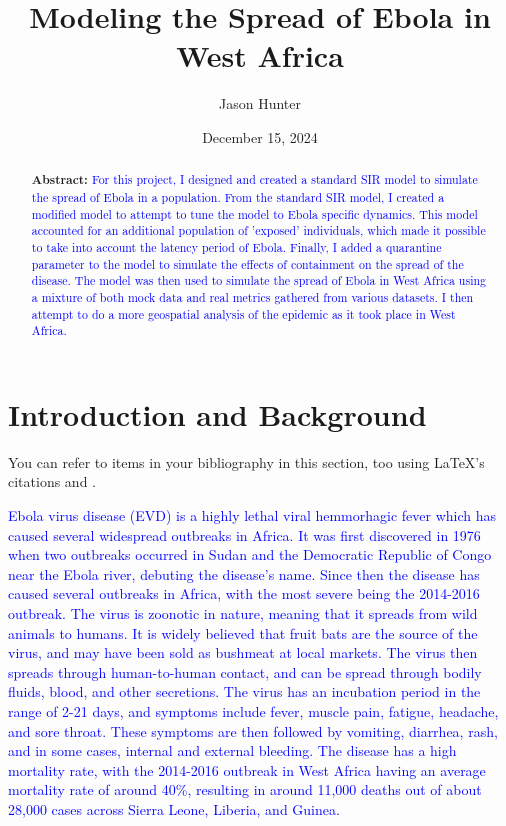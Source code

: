 \documentclass[%
 reprint,
superscriptaddress,
 amsmath,amssymb,
 aps,
]{revtex4-2}
\begin{document}
\title{Modeling the Spread of Ebola in West Africa} %

\author{Jason Hunter}


\date{December 15, 2024}%

\begin{abstract}
{\bf Abstract:} \textcolor{blue}{For this project, I designed and created a standard SIR model to simulate the spread of Ebola in a population. From the standard SIR model, I created a modified model to attempt to tune the model to Ebola specific dynamics. This model accounted for an additional population of 'exposed' individuals, which made it possible to take into account the latency period of Ebola. Finally, I added a quarantine parameter to the model to simulate the effects of containment on the spread of the disease. The model was then used to simulate the spread of Ebola in West Africa using a mixture of both mock data and real metrics gathered from various datasets. I then attempt to do a more geospatial analysis of the epidemic as it took place in West Africa.}
\end{abstract}

\maketitle

\section{Introduction and Background}

You can refer to items in your bibliography in this section, too using LaTeX's citations \cite{aa} and \cite{bb}.

\textcolor{blue}{ Ebola virus disease (EVD) is a highly lethal viral hemmorhagic fever which has caused several widespread outbreaks in Africa. It was first discovered in 1976 when two outbreaks occurred in Sudan and the Democratic Republic of Congo near the Ebola river, debuting the disease's name. Since then the disease has caused several outbreaks in Africa, with the most severe being the 2014-2016 outbreak. 
The virus is zoonotic in nature, meaning that it spreads from wild animals to humans. It is widely believed that fruit bats are the source of the virus, and may have been sold as bushmeat at local markets. The virus then spreads through human-to-human contact, and can be spread through bodily fluids, blood, and other secretions. 
The virus has an incubation period in the range of 2-21 days, and symptoms include fever, muscle pain, fatigue, headache, and sore throat. These symptoms are then followed by vomiting, diarrhea, rash, and in some cases, internal and external bleeding. The disease has a high mortality rate, with the 2014-2016 outbreak in West Africa having an average mortality rate of around 40\%, resulting in around 11,000 deaths out of about 28,000 cases across Sierra Leone, Liberia, and Guinea.}
\end{document}
